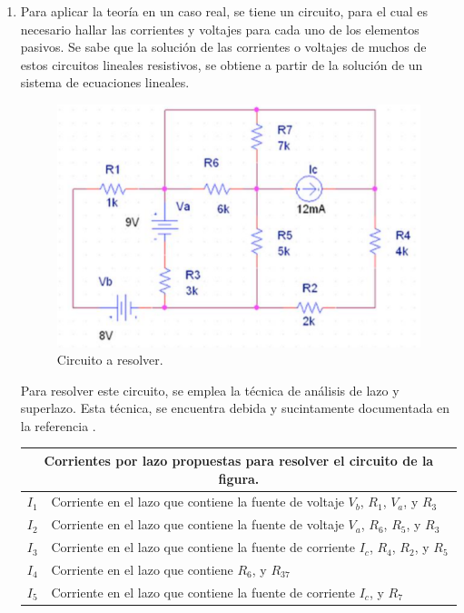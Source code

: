 \documentclass[11pt, spanish]{article}
\begin{document}
\begin{enumerate}
\item Para aplicar la teoría en un caso real, se tiene un circuito, para el cual es necesario hallar las corrientes y voltajes para cada uno de los elementos pasivos. Se sabe que la solución de las corrientes o voltajes de muchos de estos circuitos lineales resistivos, se obtiene a partir de la solución de un sistema de ecuaciones lineales.

\begin{figure}[htbp]
\centering
	\includegraphics[scale=0.55]{data/img/circuit}
	\caption{Circuito a resolver.}
\end{figure}

Para resolver este circuito, se emplea la técnica de análisis de lazo y superlazo. Esta técnica, se encuentra debida y sucintamente documentada en la referencia \cite{valkenburg1999circuits}.\\

\begin{tabular}{ |l|l| }
  \hline
  \multicolumn{2}{|c|}{Corrientes por lazo propuestas para resolver el circuito de la figura.} \\
  \hline
  $I_1$ & Corriente en el lazo que contiene la fuente de voltaje $V_b$, $R_1$, $V_a$, y $R_3$ \\
  $I_2$ & Corriente en el lazo que contiene la fuente de voltaje $V_a$, $R_6$, $R_5$, y $R_3$ \\
  $I_3$ & Corriente en el lazo que contiene la fuente de corriente $I_c$, $R_4$, $R_2$, y $R_5$ \\
  $I_4$ & Corriente en el lazo que contiene $R_6$,  y $R_37$ \\
  $I_5$ & Corriente en el lazo que contiene la fuente de corriente $I_c$,  y $R_7$ \\
  \hline
\end{tabular}\\


\end{enumerate}
\end{document}
